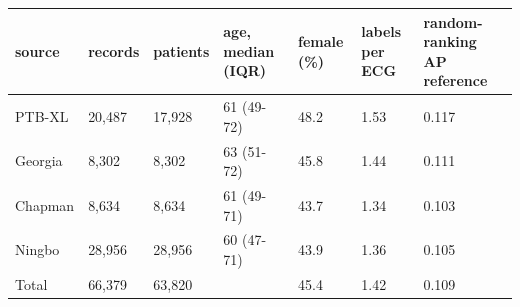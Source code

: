 \begin{tabular}{lllllll}
\toprule
source & records & patients & age, median (IQR) & female (\%) & labels per ECG & random-ranking AP reference \\
\midrule
PTB-XL & 20,487 & 17,928 & 61 (49-72) & 48.2 & 1.53 & 0.117 \\
Georgia & 8,302 & 8,302 & 63 (51-72) & 45.8 & 1.44 & 0.111 \\
Chapman & 8,634 & 8,634 & 61 (49-71) & 43.7 & 1.34 & 0.103 \\
Ningbo & 28,956 & 28,956 & 60 (47-71) & 43.9 & 1.36 & 0.105 \\
Total & 66,379 & 63,820 &  & 45.4 & 1.42 & 0.109 \\
\bottomrule
\end{tabular}
